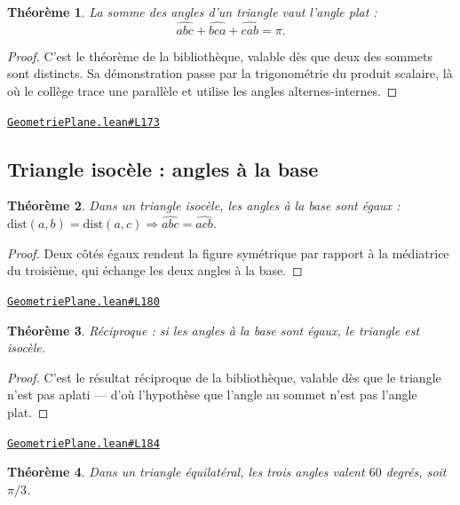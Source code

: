 \documentclass[11pt,a4paper]{article}
\theoremstyle{definition}
\theoremstyle{plain}
\newtheorem{theoreme}{Théorème}
\newcommand{\source}[2]{\par\smallskip\noindent\hfill{\footnotesize\href{#1}{\texttt{#2}}}\par\smallskip}
\begin{document}
\begin{theoreme}
La somme des angles d'un triangle vaut l'angle plat :
\[ \widehat{abc} + \widehat{bca} + \widehat{cab} = \pi . \]
\end{theoreme}

\begin{proof}
C'est le théorème de la bibliothèque, valable dès que deux des sommets sont distincts.
Sa démonstration passe par la trigonométrie du produit scalaire, là où le collège trace
une parallèle et utilise les angles alternes-internes.
\end{proof}
\source{https://github.com/Commutator-IO/learn-lean/blob/main/cours/01-college/02-geometrie-plane/GeometriePlane.lean\#L173}{GeometriePlane.lean\#L173}

\subsection{Triangle isocèle : angles à la base}

\begin{theoreme}
Dans un triangle isocèle, les angles à la base sont égaux :
$\mathrm{dist}(a,b) = \mathrm{dist}(a,c) \Rightarrow \widehat{abc} = \widehat{acb}$.
\end{theoreme}

\begin{proof}
Deux côtés égaux rendent la figure symétrique par rapport à la médiatrice du troisième,
qui échange les deux angles à la base.
\end{proof}
\source{https://github.com/Commutator-IO/learn-lean/blob/main/cours/01-college/02-geometrie-plane/GeometriePlane.lean\#L180}{GeometriePlane.lean\#L180}

\begin{theoreme}
Réciproque : si les angles à la base sont égaux, le triangle est isocèle.
\end{theoreme}

\begin{proof}
C'est le résultat réciproque de la bibliothèque, valable dès que le triangle n'est pas
aplati — d'où l'hypothèse que l'angle au sommet n'est pas l'angle plat.
\end{proof}
\source{https://github.com/Commutator-IO/learn-lean/blob/main/cours/01-college/02-geometrie-plane/GeometriePlane.lean\#L184}{GeometriePlane.lean\#L184}

\begin{theoreme}
Dans un triangle équilatéral, les trois angles valent $60$ degrés, soit $\pi/3$.
\end{theoreme}
\end{document}
